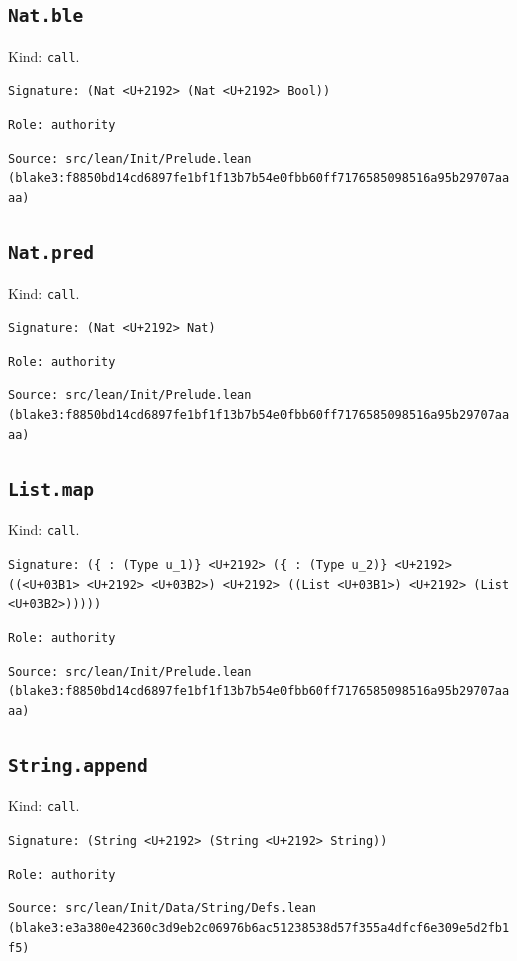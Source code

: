 \documentclass[11pt]{article}
\begin{document}
\subsection*{\texttt{Nat.ble}}
\noindent Kind: \texttt{call}.\par
\noindent \texttt{Signature: (Nat <U+2192> (Nat <U+2192> Bool))}\par
\noindent \texttt{Role: authority}\par
\noindent \texttt{Source: src/lean/Init/Prelude.lean (blake3:f8850bd14cd6897fe1bf1f13b7b54e0fbb60ff7176585098516a95b29707aaaa)}\par
\subsection*{\texttt{Nat.pred}}
\noindent Kind: \texttt{call}.\par
\noindent \texttt{Signature: (Nat <U+2192> Nat)}\par
\noindent \texttt{Role: authority}\par
\noindent \texttt{Source: src/lean/Init/Prelude.lean (blake3:f8850bd14cd6897fe1bf1f13b7b54e0fbb60ff7176585098516a95b29707aaaa)}\par
\subsection*{\texttt{List.map}}
\noindent Kind: \texttt{call}.\par
\noindent \texttt{Signature: (\{<U+03B1> : (Type u\_1)\} <U+2192> (\{<U+03B2> : (Type u\_2)\} <U+2192> ((<U+03B1> <U+2192> <U+03B2>) <U+2192> ((List <U+03B1>) <U+2192> (List <U+03B2>)))))}\par
\noindent \texttt{Role: authority}\par
\noindent \texttt{Source: src/lean/Init/Prelude.lean (blake3:f8850bd14cd6897fe1bf1f13b7b54e0fbb60ff7176585098516a95b29707aaaa)}\par
\subsection*{\texttt{String.append}}
\noindent Kind: \texttt{call}.\par
\noindent \texttt{Signature: (String <U+2192> (String <U+2192> String))}\par
\noindent \texttt{Role: authority}\par
\noindent \texttt{Source: src/lean/Init/Data/String/Defs.lean (blake3:e3a380e42360c3d9eb2c06976b6ac51238538d57f355a4dfcf6e309e5d2fb1f5)}\par
\end{document}
